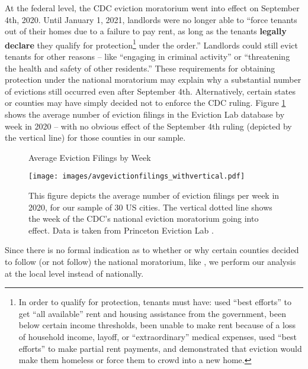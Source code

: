 \documentclass[12pt]{amsart}
\begin{document}
At the federal level, the CDC eviction moratorium went into effect on September 4th, 2020. %
Until January 1, 2021, landlords were no longer able to ``force tenants out of their homes due to a failure to pay rent, as long as the tenants \textbf{legally declare} they qualify for protection\footnote{In order to qualify for protection, tenants must have: used ``best efforts” to get ``all available” rent and housing assistance from the government, been below certain income thresholds, been unable to make rent because of a loss of household income, layoff, or ``extraordinary'' medical expenses, used ``best efforts'' to make partial rent payments, and demonstrated that eviction would make them homeless or force them to crowd into a new home.} under the order.'' %
Landlords could still evict tenants for other reasons -- like ``engaging in criminal activity'' or ``threatening the health and safety of other residents.'' These requirements for obtaining protection under the national moratorium may explain why a substantial number of evictions still occurred even after September 4th. Alternatively, certain states or counties may have simply decided not to enforce the CDC ruling. Figure \ref{fig:filingsperweek} shows the average number of eviction filings in the Eviction Lab database by week in 2020 -- with no obvious effect of the September 4th ruling (depicted by the vertical line) for those counties in our sample. 

\begin{figure}
    \centering
    \caption{Average Eviction Filings by Week} 
    \texttt{[image: images/avgevictionfilings\_withvertical.pdf]}
    \caption*{This figure depicts the average number of eviction filings per week in 2020, for our sample of 30 US cities. The vertical dotted line shows the week of the CDC's national eviction moratorium going into effect. Data is taken from Princeton Eviction Lab \cite{evictionlab}.}
    \label{fig:filingsperweek}
\end{figure}

Since there is no formal indication as to whether or why certain counties decided to follow (or not follow) the national moratorium, like , we perform our analysis at the local level instead of nationally. 
\end{document}
